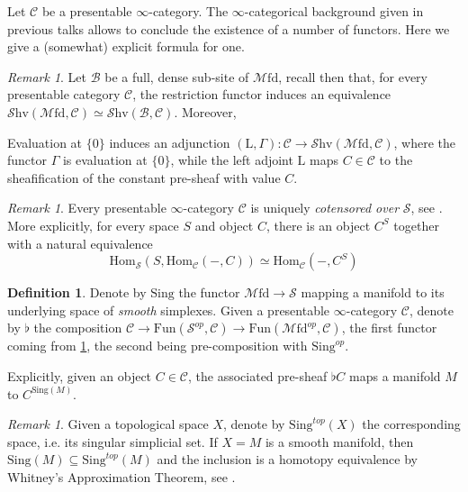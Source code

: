 \documentclass[10pt]{amsart}
\newcommand{\B}{\mathscr{B}}
\newcommand{\C}{\mathscr{C}}
\newcommand{\s}{\mathscr{S}}
\newcommand{\Hom}{\mathrm{Hom}}
\newcommand{\Fun}{\mathrm{Fun}}
\newcommand{\Mfd}{\mathscr{M}\mathrm{fd}}
\newcommand{\Shv}{\mathscr{S}\mathrm{hv}}
\newcommand{\Sing}{\mathrm{Sing}}
\newcommand{\const}{\mathrm{L}}
\theoremstyle{definition}
\newtheorem{definition}[equation]{Definition}
\theoremstyle{remark}
\newtheorem{remark}[equation]{Remark}
\numberwithin{equation}{section}
\begin{document}
Let $\C$ be a presentable $\infty$-category. The $\infty$-categorical background given in previous talks allows to conclude the existence of a number of functors. Here we give a (somewhat) explicit formula for one. 
\begin{remark}
  Let $\B$ be a full, dense sub-site of $\Mfd$, recall then that, for every presentable category $\C$, the restriction functor induces an equivalence $\Shv(\Mfd,\C)\simeq\Shv(\B,\C)$. Moreover,
\end{remark}
Evaluation at $\{0\}$ induces an adjunction $(\const,\Gamma):\C\to\Shv(\Mfd,\C)$, where the functor $\Gamma$ is evaluation at $\{0\}$, while the left adjoint $\const$ maps $C\in\C$ to the sheafification of the constant pre-sheaf with value $C$. 
\begin{remark}\label{rmk:cotensor}
Every presentable $\infty$-category $\C$ is uniquely \emph{cotensored over} $\s$, see \cite[Remark 5.5.2.6]{lurie2009htt}. More explicitly, for every space $S$ and object $C$, there is an object $C^S$ together with a natural equivalence $$\Hom_\s(S,\Hom_\C(-,C))\simeq\Hom_\C(-,C^S)$$
\end{remark}
\begin{definition}
  Denote by $\Sing$ the functor $\Mfd\to\s$ mapping a manifold to its underlying space of \emph{smooth} simplexes. Given a presentable $\infty$-category $\C$, denote by $\flat$ the composition $\C\to\Fun(\s^{op},\C)\to\Fun(\Mfd^{op},\C)$, the first functor coming from \cref{rmk:cotensor}, the second being pre-composition with $\Sing^{op}$.
\end{definition}
Explicitly, given an object $C\in\C$, the associated pre-sheaf $\flat C$ maps a manifold $M$ to $C^{\Sing(M)}$.
\begin{remark}
  Given a topological space $X$, denote by $\Sing^{top}(X)$ the corresponding space, i.e. its singular simplicial set. If $X=M$ is a smooth manifold, then $\Sing(M)\subseteq\Sing^{top}(M)$ and the inclusion is a homotopy equivalence by Whitney's Approximation Theorem, see \cite[Theorem 1.6]{zuoqin2021whitney}. 
\end{remark}
\end{document}
